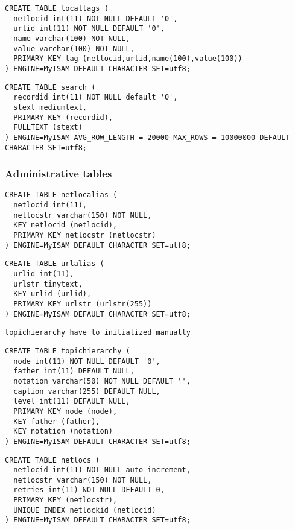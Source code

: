\begin{verbatim}
CREATE TABLE localtags (
  netlocid int(11) NOT NULL DEFAULT '0',
  urlid int(11) NOT NULL DEFAULT '0',
  name varchar(100) NOT NULL,
  value varchar(100) NOT NULL,
  PRIMARY KEY tag (netlocid,urlid,name(100),value(100))
) ENGINE=MyISAM DEFAULT CHARACTER SET=utf8;
\end{verbatim}

\begin{verbatim}
CREATE TABLE search (
  recordid int(11) NOT NULL default '0',
  stext mediumtext,
  PRIMARY KEY (recordid),
  FULLTEXT (stext)
) ENGINE=MyISAM AVG_ROW_LENGTH = 20000 MAX_ROWS = 10000000 DEFAULT CHARACTER SET=utf8;
\end{verbatim}

\subsubsection{Administrative tables}
\begin{verbatim}
CREATE TABLE netlocalias (
  netlocid int(11),
  netlocstr varchar(150) NOT NULL,
  KEY netlocid (netlocid),
  PRIMARY KEY netlocstr (netlocstr)
) ENGINE=MyISAM DEFAULT CHARACTER SET=utf8;
\end{verbatim}

\begin{verbatim}
CREATE TABLE urlalias (
  urlid int(11),
  urlstr tinytext,
  KEY urlid (urlid),
  PRIMARY KEY urlstr (urlstr(255))
) ENGINE=MyISAM DEFAULT CHARACTER SET=utf8;
\end{verbatim}

\verb+topichierarchy have to initialized manually+\\
\begin{verbatim}
CREATE TABLE topichierarchy (
  node int(11) NOT NULL DEFAULT '0',
  father int(11) DEFAULT NULL,
  notation varchar(50) NOT NULL DEFAULT '',
  caption varchar(255) DEFAULT NULL,
  level int(11) DEFAULT NULL,
  PRIMARY KEY node (node),
  KEY father (father),
  KEY notation (notation)
) ENGINE=MyISAM DEFAULT CHARACTER SET=utf8;
\end{verbatim}

\begin{verbatim}
CREATE TABLE netlocs (
  netlocid int(11) NOT NULL auto_increment,
  netlocstr varchar(150) NOT NULL,
  retries int(11) NOT NULL DEFAULT 0,
  PRIMARY KEY (netlocstr),
  UNIQUE INDEX netlockid (netlocid)
) ENGINE=MyISAM DEFAULT CHARACTER SET=utf8;
\end{verbatim}

